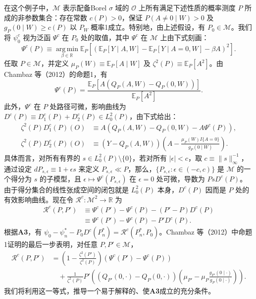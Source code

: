 在这个例子中，$\mathcal M$ 表示配备Borel $\sigma$ 域的 $\mathcal O$ 上所有满足下述性质的概率测度 $P$ 所成的非参数集合：存在常数 $c(P)>0$，保证 $P(A\ne0\mid W)>0$ 及 $g_P(0\mid W)\ge c(P)$ 以 $P_W$ 概率1成立。特别地，由上述假设，有 $P_0\in\mathcal M$。我们将 $\psi_0^c$ 视为泛函 $\Psi^c$ 在 $P_0$ 处的取值，其中 $\Psi^c$ 在 $\mathcal M$ 上由下式刻画：
\[
\Psi^c(P)\equiv\operatorname*{arg\,min}_{\beta\in\mathbb R}
\mathbb E_P\!\left[\left(\mathbb E_P[Y\mid A,W]
-\mathbb E_P[Y\mid A=0,W]-\beta A\right)^2\right].
\]
任取 $P\in\mathcal M$，并定义 $\mu_P(W)\equiv\mathbb E_P[A\mid W]$ 及 $\zeta^2(P)\equiv\mathbb E_P[A^2]$。由 Chambaz 等（2012）的命题1，有
\[
\Psi^c(P)=\frac{\mathbb E_P[A(Q_P(A,W)-Q_P(0,W))]}{\mathbb E_P[A^2]}.
\]
此外，$\Psi^c$ 在 $P$ 处路径可微，影响曲线为 $D^c(P)\equiv D_1^c(P)+D_2^c(P)\in L_0^2(P)$，由下式给出：
\[
\begin{aligned}
\zeta^2(P)D_1^c(P)(O)
&\equiv A\left(Q_P(A,W)-Q_P(0,W)-A\Psi^c(P)\right),\\
\zeta^2(P)D_2^c(P)(O)
&\equiv(Y-Q_P(A,W))
\left(A-\frac{\mu_P(W)I\{A=0\}}{g_P(0\mid W)}\right).
\end{aligned}
\]
具体而言，对所有有界的 $s\in L_0^2(P)\setminus\{0\}$，若对所有 $|\epsilon|<c$，取 $c\equiv\|s\|_\infty^{-1}$，通过设定 $dP_{s,\epsilon}\equiv1+\epsilon s$ 来定义 $P_{s,\epsilon}\ll P$，那么，$\{P_{s,\epsilon}:\epsilon\in(-c,c)\}$ 是 $\mathcal M$ 的一个得分为 $s$ 的子模型，且 $\epsilon\mapsto\Psi^c(P_{s,\epsilon})$ 在 $\epsilon=0$ 处可微，导数为 $PsD^c(P)$。由于得分集合的线性张成空间的闭包就是 $L_0^2(P)$ 本身，$D^c(P)$ 因而是 $P$ 处的有效影响曲线。现在令 $\mathcal R^c:\mathcal M^2\to\mathbb R$ 为
\[
\begin{aligned}
\mathcal R^c(P,P')
&\equiv\Psi^c(P')-\Psi^c(P)-(P'-P)D^c(P)\\
&\equiv\Psi^c(P')-\Psi^c(P)-P'D^c(P).
\end{aligned}
\]
根据\textbf{A3}，有 $\psi_0-\psi_n^*-P_0D^c(P_n^*)=\mathcal R^c(P_n^*,P_0)$。Chambaz 等（2012）中命题1证明的最后一步表明，对任意 $P,P'\in\mathcal M$，
\begin{equation}
\begin{aligned}
\mathcal R^c(P,P')
&=\left(1-\frac{\zeta^2(P')}{\zeta^2(P)}\right)
\left(\Psi^c(P')-\Psi^c(P)\right)\\
&\quad+\frac1{\zeta^2(P)}P'\!\left(
\left(Q_{P'}(0,\cdot)-Q_P(0,\cdot)\right)
\left(\mu_{P'}-\mu_P\frac{g_{P'}(0\mid\cdot)}{g_P(0\mid\cdot)}\right)
\right).
\end{aligned}
\tag{29.14}
\end{equation}
我们将利用这一等式，推导一个易于解释的、使\textbf{A3}成立的充分条件。

